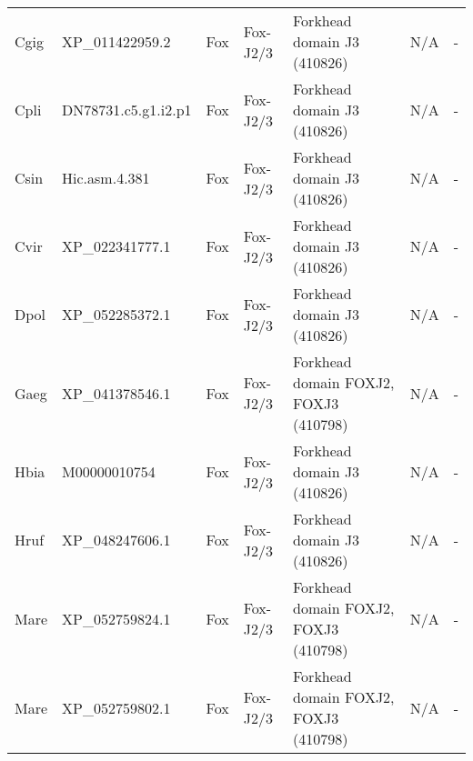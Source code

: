 \documentclass[../main.tex]{subfiles}
\begin{document}
\begin{landscape}
\begin{longtable}{lllllll}
		Cgig           & XP\_011422959.2       & Fox            & Fox-J2/3            & Forkhead domain J3 (410826)                 & N/A                                                                    & -                    \\
		Cpli           & DN78731.c5.g1.i2.p1   & Fox            & Fox-J2/3            & Forkhead domain J3 (410826)                 & N/A                                                                    & -                    \\
		Csin           & Hic.asm.4.381         & Fox            & Fox-J2/3            & Forkhead domain J3 (410826)                 & N/A                                                                    & -                    \\
		Cvir           & XP\_022341777.1       & Fox            & Fox-J2/3            & Forkhead domain J3 (410826)                 & N/A                                                                    & -                    \\
		Dpol           & XP\_052285372.1       & Fox            & Fox-J2/3            & Forkhead domain J3 (410826)                 & N/A                                                                    & -                    \\
		Gaeg           & XP\_041378546.1       & Fox            & Fox-J2/3            & Forkhead domain FOXJ2, FOXJ3 (410798)       & N/A                                                                    & -                    \\
		Hbia           & M00000010754          & Fox            & Fox-J2/3            & Forkhead domain J3 (410826)                 & N/A                                                                    & -                    \\
		Hruf           & XP\_048247606.1       & Fox            & Fox-J2/3            & Forkhead domain J3 (410826)                 & N/A                                                                    & -                    \\
		Mare           & XP\_052759824.1       & Fox            & Fox-J2/3            & Forkhead domain FOXJ2, FOXJ3 (410798)       & N/A                                                                    & -                    \\
		Mare           & XP\_052759802.1       & Fox            & Fox-J2/3            & Forkhead domain FOXJ2, FOXJ3 (410798)       & N/A                                                                    & -                    \\

\end{longtable}
\end{landscape}
\end{document}
